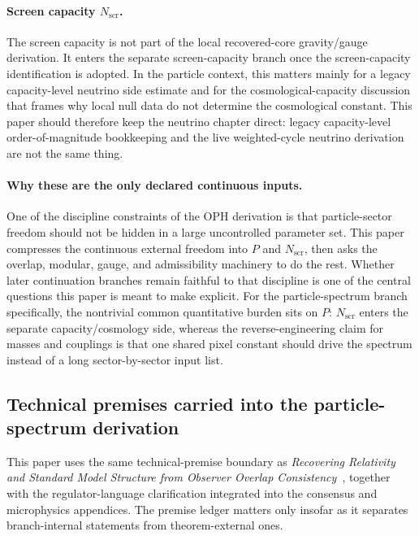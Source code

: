 \documentclass[11pt]{article}
\begin{document}
\paragraph{Screen capacity \(N_{\mathrm{scr}}\).}
The screen capacity is not part of the local recovered-core gravity/gauge derivation. It enters
the separate screen-capacity branch once the screen-capacity identification is adopted. In the
particle context, this matters mainly for a legacy capacity-level neutrino side estimate and for the
cosmological-capacity discussion that frames why local null data do not determine the
cosmological constant. This paper should therefore keep the neutrino chapter direct:
legacy capacity-level order-of-magnitude bookkeeping and the live weighted-cycle neutrino derivation are not the
same thing.

\paragraph{Why these are the only declared continuous inputs.}
One of the discipline constraints of the OPH derivation is that particle-sector freedom should not
be hidden in a large uncontrolled parameter set. This paper compresses the
continuous external freedom into \(P\) and \(N_{\mathrm{scr}}\), then asks the overlap,
modular, gauge, and admissibility machinery to do the rest. Whether later continuation branches
remain faithful to that discipline is one of the central questions this paper is meant to
make explicit. For the particle-spectrum branch specifically, the nontrivial common quantitative
burden sits on \(P\): \(N_{\mathrm{scr}}\) enters the separate capacity/cosmology side, whereas
the reverse-engineering claim for masses and couplings is that one shared pixel constant should
drive the spectrum instead of a long sector-by-sector input list.

\subsection{Technical premises carried into the particle-spectrum derivation}

This paper uses the same technical-premise boundary as
\emph{Recovering Relativity and Standard Model Structure from Observer Overlap Consistency}~\cite{ophcompact}, together with
the regulator-language clarification integrated into the consensus and microphysics
appendices. The premise ledger matters only
insofar as it separates branch-internal statements from theorem-external ones.
\end{document}
